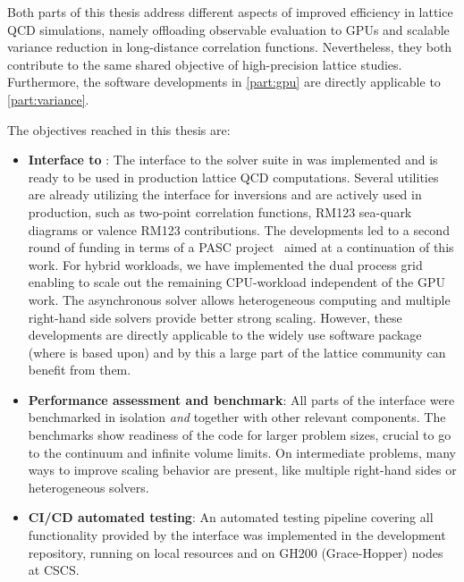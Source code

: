 
Both parts of this thesis address different aspects of improved efficiency in lattice QCD simulations, namely offloading observable evaluation to GPUs and scalable variance reduction in long-distance correlation functions.
Nevertheless, they both contribute to the same shared objective of high-precision lattice studies.
Furthermore, the software developments in \cref{part:gpu} are directly applicable to \cref{part:variance}.

The objectives reached in this thesis are: 
\begin{itemize}
   \item \textbf{Interface to \quda}: The interface to the solver suite in \quda was implemented and is ready to be used in production lattice QCD computations. Several utilities are already utilizing the interface for inversions and are actively used in production, such as two-point correlation functions, RM123 sea-quark diagrams or valence RM123 contributions. The developments led to a second round of funding in terms of a PASC project~\cite{online:pasc2025} aimed at a continuation of this work. For hybrid workloads, we have implemented the dual process grid enabling to scale out the remaining CPU-workload independent of the GPU work. The asynchronous solver allows heterogeneous computing and multiple right-hand side solvers provide better strong scaling. However, these developments are directly applicable to the widely use software package \openqcd (where \openqxd is based upon) and by this a large part of the lattice community can benefit from them.
   \item \textbf{Performance assessment and benchmark}: All parts of the interface were benchmarked in isolation \emph{and} together with other relevant components. The benchmarks show readiness of the code for larger problem sizes, crucial to go to the continuum and infinite volume limits. On intermediate problems, many ways to improve scaling behavior are present, like multiple right-hand sides or heterogeneous solvers.
   \item \textbf{CI/CD automated testing}: An automated testing pipeline covering all functionality provided by the interface was implemented in the development repository, running on local resources and on GH200 (Grace-Hopper) nodes at CSCS.

\end{itemize}
